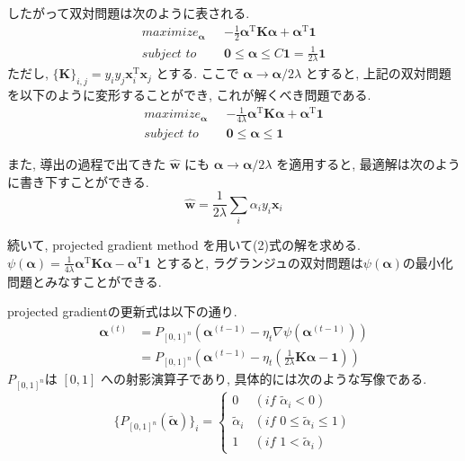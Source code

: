 \documentclass[a4paper,10pt]{jsarticle}
\begin{document}
したがって双対問題は次のように表される.
\begin{align*}
 maximize_{\bm{\alpha}} \,\,\,\,
 & -\frac{1}{2}\bm{\alpha}^\mathrm{T}\bm{K}\mathrm{\bm{\alpha}}
 + \bm{\alpha}^\mathrm{T}\bm{1}\\
 subject \,\, to \,\,\,\, &\bm{0} \leq \bm{\alpha} \leq C\bm{1}
 = \frac{1}{2\lambda}\bm{1}
\end{align*}
ただし, $\{\bm{K}\}_{i, j} = y_iy_j\bm{x}_i^\mathrm{T}\bm{x}_j$ とする.
ここで $\bm{\alpha} \rightarrow \bm{\alpha}/2\lambda$ とすると,
上記の双対問題を以下のように変形することができ, これが解くべき問題である.
\begin{align}
 maximize_{\bm{\alpha}} \,\,\,\,
 & -\frac{1}{4\lambda}\bm{\alpha}^\mathrm{T}\bm{K}\mathrm{\bm{\alpha}}
 + \bm{\alpha}^\mathrm{T}\bm{1}\\
 subject \,\, to \,\,\,\, &\bm{0} \leq \bm{\alpha} \leq \bm{1}
\end{align}

また, 導出の過程で出てきた $\hat{\bm{w}}$ にも
$\bm{\alpha} \rightarrow \bm{\alpha}/2\lambda$ を適用すると,
最適解は次のように書き下すことができる.
\[ \hat{\bm{w}} = \frac{1}{2\lambda}\sum_{i}\alpha_iy_i\bm{x}_i \]

続いて, projected gradient method を用いて(2)式の解を求める.
$\psi(\bm{\alpha}) = \frac{1}{4\lambda}\bm{\alpha}^\mathrm{T}\bm{K}\mathrm{\bm{\alpha}}
 - \bm{\alpha}^\mathrm{T}\bm{1}$
とすると, ラグランジュの双対問題は$\psi(\bm{\alpha})$の最小化問題とみなすことができる.

projected gradientの更新式は以下の通り.
\begin{align*}
 \bm{\alpha}^{(t)}
 & = P_{[0,1]^n}(\bm{\alpha}^{(t-1)} - \eta_t\nabla\psi(\bm{\alpha}^{(t-1)}))\\
 & = P_{[0,1]^n}\left(\bm{\alpha}^{(t-1)} - \eta_t\left(
 \frac{1}{2\lambda}\bm{K}\bm{\alpha} - \bm{1}\right)\right)
\end{align*}
$P_{[0,1]^n}$は $[0, 1]$ への射影演算子であり, 具体的には次のような写像である.
\[
  \{P_{[0,1]^n}(\tilde{\bm{\alpha}})\}_i
  = \begin{cases}
     0 &(\mathit{if} \,\, \tilde{\alpha}_i < 0)\\
     \tilde{\alpha}_i &(\mathit{if} \,\, 0 \leq \tilde{\alpha}_i \leq 1)\\
     1 &(\mathit{if} \,\, 1 < \tilde{\alpha}_i)
    \end{cases}
\]
\end{document}
